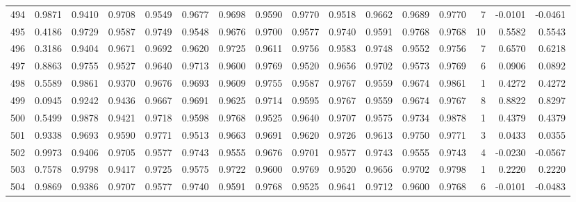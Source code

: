 \begin{tabular}{lrrrrrrrrrrrrrrr}
494 &      0.9871 &  0.9410 &  0.9708 &  0.9549 &  0.9677 &  0.9698 &  0.9590 &  0.9770 &  0.9518 &  0.9662 &   0.9689 &     0.9770 &      7 &                   -0.0101 &                    -0.0461 \\
495 &      0.4186 &  0.9729 &  0.9587 &  0.9749 &  0.9548 &  0.9676 &  0.9700 &  0.9577 &  0.9740 &  0.9591 &   0.9768 &     0.9768 &     10 &                    0.5582 &                     0.5543 \\
496 &      0.3186 &  0.9404 &  0.9671 &  0.9692 &  0.9620 &  0.9725 &  0.9611 &  0.9756 &  0.9583 &  0.9748 &   0.9552 &     0.9756 &      7 &                    0.6570 &                     0.6218 \\
497 &      0.8863 &  0.9755 &  0.9527 &  0.9640 &  0.9713 &  0.9600 &  0.9769 &  0.9520 &  0.9656 &  0.9702 &   0.9573 &     0.9769 &      6 &                    0.0906 &                     0.0892 \\
498 &      0.5589 &  0.9861 &  0.9370 &  0.9676 &  0.9693 &  0.9609 &  0.9755 &  0.9587 &  0.9767 &  0.9559 &   0.9674 &     0.9861 &      1 &                    0.4272 &                     0.4272 \\
499 &      0.0945 &  0.9242 &  0.9436 &  0.9667 &  0.9691 &  0.9625 &  0.9714 &  0.9595 &  0.9767 &  0.9559 &   0.9674 &     0.9767 &      8 &                    0.8822 &                     0.8297 \\
500 &      0.5499 &  0.9878 &  0.9421 &  0.9718 &  0.9598 &  0.9768 &  0.9525 &  0.9640 &  0.9707 &  0.9575 &   0.9734 &     0.9878 &      1 &                    0.4379 &                     0.4379 \\
501 &      0.9338 &  0.9693 &  0.9590 &  0.9771 &  0.9513 &  0.9663 &  0.9691 &  0.9620 &  0.9726 &  0.9613 &   0.9750 &     0.9771 &      3 &                    0.0433 &                     0.0355 \\
502 &      0.9973 &  0.9406 &  0.9705 &  0.9577 &  0.9743 &  0.9555 &  0.9676 &  0.9701 &  0.9577 &  0.9743 &   0.9555 &     0.9743 &      4 &                   -0.0230 &                    -0.0567 \\
503 &      0.7578 &  0.9798 &  0.9417 &  0.9725 &  0.9575 &  0.9722 &  0.9600 &  0.9769 &  0.9520 &  0.9656 &   0.9702 &     0.9798 &      1 &                    0.2220 &                     0.2220 \\
504 &      0.9869 &  0.9386 &  0.9707 &  0.9577 &  0.9740 &  0.9591 &  0.9768 &  0.9525 &  0.9641 &  0.9712 &   0.9600 &     0.9768 &      6 &                   -0.0101 &                    -0.0483 \\

\end{tabular}
